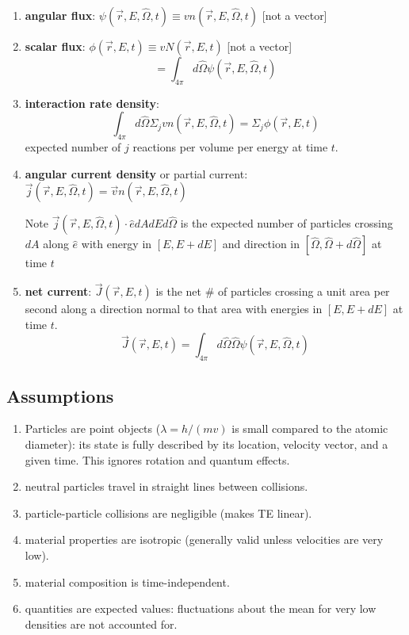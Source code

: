 \documentclass[12pt]{article}
\newcommand{\vOmega}{\ensuremath{\hat{\Omega}}}
\begin{document}
\begin{enumerate}
\item \textbf{angular flux}: $\psi(\vec{r}, E, \vOmega, t) \equiv v n(\vec{r}, E, \vOmega, t)$ [not a vector]

\item \textbf{scalar flux}: $\phi(\vec{r},E,t) \equiv v N(\vec{r},E,t)$ [not a vector]
\[= \int_{4\pi} d\vOmega \psi(\vec{r}, E, \vOmega, t) \]

\item \textbf{interaction rate density}:
\[\int_{4\pi} d\vOmega \Sigma_j v n(\vec{r}, E, \vOmega, t) = \Sigma_j \phi(\vec{r},E,t)\]
expected number of $j$ reactions per volume per energy at time $t$.

\item \textbf{angular current density} or partial current: $\vec{j}(\vec{r}, E, \vOmega, t) = \vec{v} n(\vec{r}, E, \vOmega, t)$ 

Note $\vec{j}(\vec{r}, E, \vOmega, t) \cdot \hat{e} dA dE d\vOmega$ is the expected number of particles crossing $dA$ along $\hat{e}$ with energy in $[E, E + dE]$ and direction in $[\vOmega, \vOmega + d\vOmega]$ at time $t$


\item \textbf{net current}: $\vec{J}(\vec{r}, E, t) $ is the net \# of particles crossing a unit area per second along a direction normal to that area with energies in $[E, E + dE]$ at time $t$.
\[\vec{J}(\vec{r}, E, t) = \int_{4\pi} d\vOmega \vOmega \psi(\vec{r}, E, \vOmega, t)\]

\end{enumerate}

\subsection{Assumptions}
\begin{enumerate}
\item Particles are point objects ($\lambda = h/(mv)$ is small compared to the atomic diameter): its state is fully described by its location, velocity vector, and a given time. This ignores rotation and quantum effects.

\item neutral particles travel in straight lines between collisions.

\item particle-particle collisions are negligible (makes TE linear).

\item material properties are isotropic (generally valid unless velocities are very low).

\item material composition is time-independent.

\item quantities are expected values: fluctuations about the mean for very low densities are not accounted for.
\end{enumerate}
\end{document}
